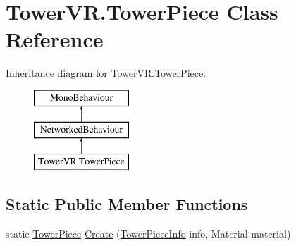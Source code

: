 \hypertarget{class_tower_v_r_1_1_tower_piece}{}\section{Tower\+V\+R.\+Tower\+Piece Class Reference}
\label{class_tower_v_r_1_1_tower_piece}
Inheritance diagram for Tower\+V\+R.\+Tower\+Piece\+:\begin{figure}[H]
\begin{center}
\leavevmode
\includegraphics[height=3.000000cm]{class_tower_v_r_1_1_tower_piece}
\end{center}
\end{figure}
\subsection*{Static Public Member Functions}
\begin{DoxyCompactItemize}
\item 
static \hyperlink{class_tower_v_r_1_1_tower_piece}{Tower\+Piece} \hyperlink{class_tower_v_r_1_1_tower_piece_a686d6c1c40c7a45e6b3bb9f31b79b12d}{Create} (\hyperlink{class_tower_v_r_1_1_tower_piece_info}{Tower\+Piece\+Info} info, Material material)
\end{DoxyCompactItemize}
